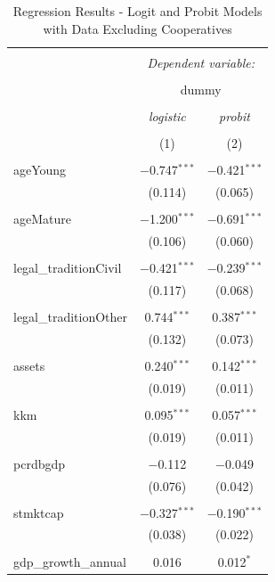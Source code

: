 \documentclass[a4paper, nobind]{templates/ociamthesis}
\begin{document}
\begin{table}[!htbp] \centering 
  \caption{Regression Results - Logit and Probit Models with Data Excluding Cooperatives} 
  \label{} 
\footnotesize 
\begin{tabular}{@{\extracolsep{5pt}}lcc} 
\\[-1.8ex]\hline 
\hline \\[-1.8ex] 
 & \multicolumn{2}{c}{\textit{Dependent variable:}} \\ 
\cline{2-3} 
\\[-1.8ex] & \multicolumn{2}{c}{dummy} \\ 
\\[-1.8ex] & \textit{logistic} & \textit{probit} \\ 
\\[-1.8ex] & (1) & (2)\\ 
\hline \\[-1.8ex] 
 ageYoung & $-$0.747$^{***}$ & $-$0.421$^{***}$ \\ 
  & (0.114) & (0.065) \\ 
  & & \\ 
 ageMature & $-$1.200$^{***}$ & $-$0.691$^{***}$ \\ 
  & (0.106) & (0.060) \\ 
  & & \\ 
 legal\_traditionCivil & $-$0.421$^{***}$ & $-$0.239$^{***}$ \\ 
  & (0.117) & (0.068) \\ 
  & & \\ 
 legal\_traditionOther & 0.744$^{***}$ & 0.387$^{***}$ \\ 
  & (0.132) & (0.073) \\ 
  & & \\ 
 assets & 0.240$^{***}$ & 0.142$^{***}$ \\ 
  & (0.019) & (0.011) \\ 
  & & \\ 
 kkm & 0.095$^{***}$ & 0.057$^{***}$ \\ 
  & (0.019) & (0.011) \\ 
  & & \\ 
 pcrdbgdp & $-$0.112 & $-$0.049 \\ 
  & (0.076) & (0.042) \\ 
  & & \\ 
 stmktcap & $-$0.327$^{***}$ & $-$0.190$^{***}$ \\ 
  & (0.038) & (0.022) \\ 
  & & \\ 
 gdp\_growth\_annual & 0.016 & 0.012$^{*}$ \\ 

\end{tabular}
\end{table}
\end{document}

